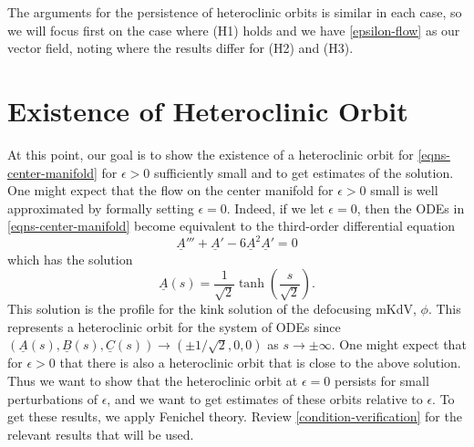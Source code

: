 The arguments for the persistence of heteroclinic orbits is similar in each case, so we will focus first on the case where (H1) holds and we have \cref{epsilon-flow} as our vector field, noting where the results differ for (H2) and (H3).
\section{Existence of Heteroclinic Orbit}



At this point, our goal is to show the existence of a heteroclinic orbit for \cref{eqns-center-manifold} for \(\epsilon>0\) sufficiently small and to get estimates of the solution. One might expect that the flow on the center manifold for \(\epsilon>0\) small is well approximated by formally setting \(\epsilon = 0\). Indeed, if we let \(\epsilon = 0\), then the ODEs in \cref{eqns-center-manifold} become equivalent to the third-order differential equation
\begin{equation*}
	\underline A ''' + \underline A'  - 6 \underline A^2 \underline A' = 0 
\end{equation*}
which has the solution 
\begin{equation*}
	\underline A(s) = \frac 1 {\sqrt 2} \tanh\left(\frac s {\sqrt 2}\right).
\end{equation*}
This solution is the profile for the kink solution of the defocusing mKdV, \(\phi\). This represents a heteroclinic orbit for the system of ODEs since \((\underline A(s), \underline B(s), \underline C(s)) \to (\pm1/\sqrt 2, 0, 0)\) as \(s\to\pm \infty.\) One might expect that for \(\epsilon > 0\) that there is also a heteroclinic orbit that is close to the above solution. Thus we want to show that the heteroclinic orbit at \(\epsilon = 0\) persists for small perturbations of \(\epsilon\), and we want to get estimates of these orbits relative to \(\epsilon\). To get these results, we apply Fenichel theory. Review \cref{condition-verification} for the relevant results that will be used.

